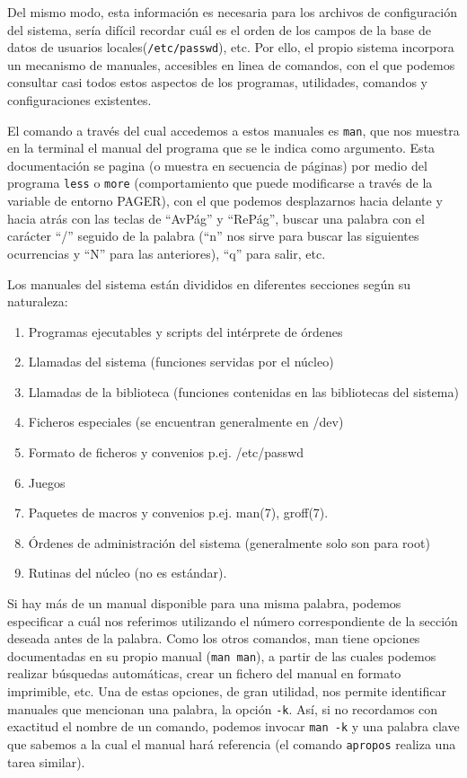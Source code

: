 \documentclass[12pt]{article}
\begin{document}
Del mismo modo, esta información es necesaria para los archivos de configuración del sistema, sería
difícil recordar cuál es el orden de los campos de la base de datos de usuarios locales(\texttt{/etc/passwd}),
etc. Por ello, el propio sistema incorpora un mecanismo de manuales, accesibles en linea de comandos, 
con el que podemos consultar casi todos estos aspectos de los programas, utilidades, comandos y 
configuraciones existentes. 

El comando a través del cual accedemos a estos manuales es \texttt{man}, que nos muestra en la terminal 
el manual del programa que se le indica como argumento. Esta 
documentación se pagina (o muestra en secuencia de páginas) por medio del programa \texttt{less} o 
\texttt{more} (comportamiento que puede modificarse a través de la variable de entorno PAGER), con el 
que podemos desplazarnos hacia delante y hacia atrás con las teclas de ``AvPág'' y ``RePág'', buscar 
una palabra con el carácter ``/'' seguido de la palabra (``n'' nos sirve para buscar las siguientes 
ocurrencias y ``N'' para las anteriores), ``q'' para salir, etc. 

Los manuales del sistema están divididos en diferentes secciones según su naturaleza:
\begin{enumerate}
\item   Programas ejecutables y scripts del intérprete de órdenes
\item   Llamadas del sistema (funciones servidas por el núcleo)
\item   Llamadas de la biblioteca (funciones contenidas en las  bibliotecas
           del sistema)
\item   Ficheros especiales (se encuentran generalmente en /dev)
\item   Formato de ficheros y convenios p.ej. /etc/passwd
\item   Juegos
\item   Paquetes de macros y convenios p.ej. man(7), groff(7).
\item   Órdenes  de  administración  del  sistema (generalmente solo son para
           root)
\item   Rutinas del núcleo (no es estándar).
\end{enumerate}
	 

Si hay más de un manual disponible para una misma palabra, podemos especificar
a cuál nos referimos utilizando el número correspondiente de la sección deseada 
antes de la palabra. Como los otros comandos, man tiene opciones documentadas 
en su propio manual (\texttt{man man}), a partir de las cuales podemos realizar 
búsquedas automáticas, crear un fichero del manual en formato imprimible, etc. 
Una de estas opciones, de gran utilidad, nos permite identificar manuales que 
mencionan una palabra, la opción \texttt{-k}. Así, si no recordamos con exactitud
el nombre de un comando, podemos invocar \texttt{man -k} y una palabra clave que 
sabemos a la cual el manual 
hará referencia (el comando \texttt{apropos} realiza una tarea similar). 
\end{document}
